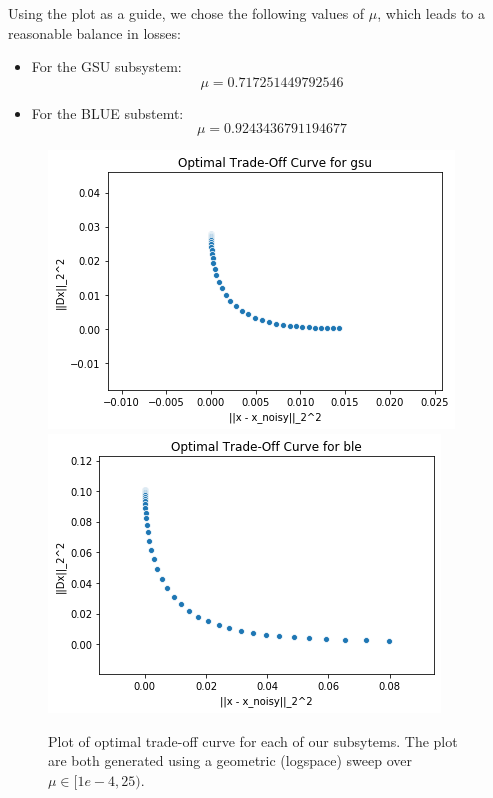 \documentclass[12pt]{exam}
\begin{document}
\begin{questions}
\begin{solution}
\begin{enumerate}[label=(\alph*)]
      Using the plot as a guide, we chose the following values of $\mu$, which leads to a reasonable balance in losses:
      \begin{itemize}
        \item
          For the GSU subsystem:
            \[
              \mu = 0.717251449792546
            \]
        \item
          For the BLUE substemt:
            \[
              \mu = 0.9243436791194677
            \] 
      \end{itemize}
  \end{enumerate}
\end{solution}
\end{questions}

\begin{figure}[!ht]
\includegraphics[scale=0.6]{gsu_optimal_trade_off.png}
\includegraphics[scale=0.6]{ble_optimal_trade_off.png}
\caption{Plot of optimal trade-off curve for each of our subsytems. The plot are both generated using a geometric (logspace) sweep over $\mu \in [1e-4, 25)$.}
\label{fig:optimal_trade_off_curces}
\end{figure}
\end{document}
